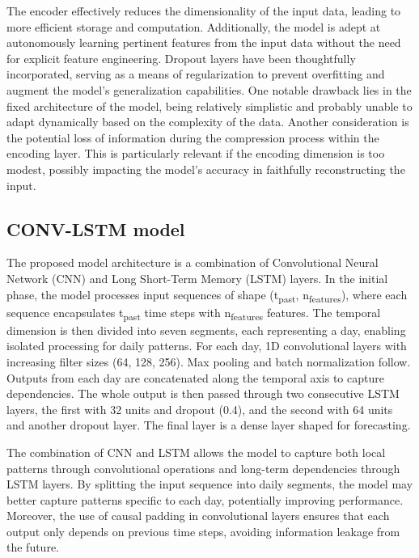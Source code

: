 The encoder effectively reduces the dimensionality of the input data, leading to more efficient storage and computation. Additionally, the model is adept at autonomously learning pertinent features from the input data without the need for explicit feature engineering. Dropout layers have been thoughtfully incorporated, serving as a means of regularization to prevent overfitting and augment the model's generalization capabilities.
One notable drawback lies in the fixed architecture of the model, being relatively simplistic and probably unable to adapt dynamically based on the complexity of the data. Another consideration is the potential loss of information during the compression process within the encoding layer. This is particularly relevant if the encoding dimension is too modest, possibly impacting the model's accuracy in faithfully reconstructing the input.

\subsection*{CONV-LSTM model}

The proposed model architecture is a combination of Convolutional Neural Network (CNN) and Long Short-Term Memory (LSTM) layers. 
In the initial phase, the model processes input sequences of shape (t\textsubscript{past}, n\textsubscript{features}), where each sequence encapsulates t\textsubscript{past} time steps with n\textsubscript{features} features. The temporal dimension is then divided into seven segments, each representing a day, enabling isolated processing for daily patterns.
For each day, 1D convolutional layers with increasing filter sizes (64, 128, 256). Max pooling and batch normalization follow. Outputs from each day are concatenated along the temporal axis to capture dependencies.
The whole output is then passed through two consecutive LSTM layers, the first with 32 units and dropout (0.4), and the second with 64 units and another dropout layer. The final layer is a dense layer shaped for forecasting.

The combination of CNN and LSTM allows the model to capture both local patterns through convolutional operations and long-term dependencies through LSTM layers. By splitting the input sequence into daily segments, the model may better capture patterns specific to each day, potentially improving performance. Moreover, the use of causal padding in convolutional layers ensures that each output only depends on previous time steps, avoiding information leakage from the future.

